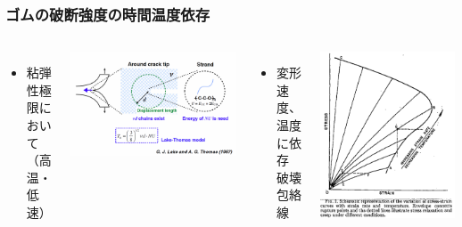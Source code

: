 \documentclass[12pt, dvipdfmx]{beamer}
\begin{document}
\begin{frame}
    \frametitle{ゴムの破断強度の時間温度依存}
    
    
    \begin{columns}[T, totalwidth=\textwidth]
    \begin{itemize}
		\item \alert{粘弾性極限において}\\
		（高温・低速）
	\end{itemize}
    \includegraphics[width=\textwidth]{Lake_Thomas.png}
    
    \begin{itemize}
		\item 変形速度、温度に依存\\
		\alert{破壊包絡線}
	\end{itemize}
	\begin{center}
		\includegraphics[width=.48\textwidth]{Time_Temp_3.png}


\end{center}
\end{columns}
\end{frame}
\end{document}
